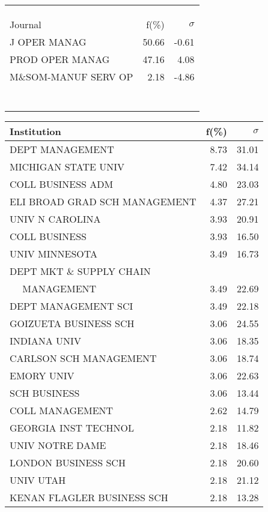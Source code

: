 \documentclass[a4paper,11pt]{report}
\begin{document}
\begin{landscape}
\begin{table}[!ht]
{\begin{tabular}{|l r  r|}
 &  & \\
 &  & \\
 &  & \\
\hline
\hline
Journal & f(\%) & $\sigma$\\
\hline
J OPER MANAG & 50.66 & -0.61\\
PROD OPER MANAG & 47.16 & 4.08\\
M\&SOM-MANUF SERV OP & 2.18 & -4.86\\
 &  & \\
 &  & \\
 &  & \\
 &  & \\
 &  & \\
 &  & \\
 &  & \\
\hline
\end{tabular}
}
{\scriptsize\begin{tabular}{|l r r|}
\hline
Institution & f(\%) & $\sigma$\\
\hline
DEPT MANAGEMENT & 8.73 & 31.01\\
MICHIGAN STATE UNIV & 7.42 & 34.14\\
COLL BUSINESS ADM & 4.80 & 23.03\\
ELI BROAD GRAD SCH MANAGEMENT & 4.37 & 27.21\\
UNIV N CAROLINA & 3.93 & 20.91\\
COLL BUSINESS & 3.93 & 16.50\\
UNIV MINNESOTA & 3.49 & 16.73\\
DEPT MKT \& SUPPLY CHAIN &  & \\
$\quad$ MANAGEMENT & 3.49 & 22.69\\
DEPT MANAGEMENT SCI & 3.49 & 22.18\\
GOIZUETA BUSINESS SCH & 3.06 & 24.55\\
INDIANA UNIV & 3.06 & 18.35\\
CARLSON SCH MANAGEMENT & 3.06 & 18.74\\
EMORY UNIV & 3.06 & 22.63\\
SCH BUSINESS & 3.06 & 13.44\\
COLL MANAGEMENT & 2.62 & 14.79\\
GEORGIA INST TECHNOL & 2.18 & 11.82\\
UNIV NOTRE DAME & 2.18 & 18.46\\
LONDON BUSINESS SCH & 2.18 & 20.60\\
UNIV UTAH & 2.18 & 21.12\\
KENAN FLAGLER BUSINESS SCH & 2.18 & 13.28\\

\end{tabular}}
\end{table}
\end{landscape}
\end{document}
